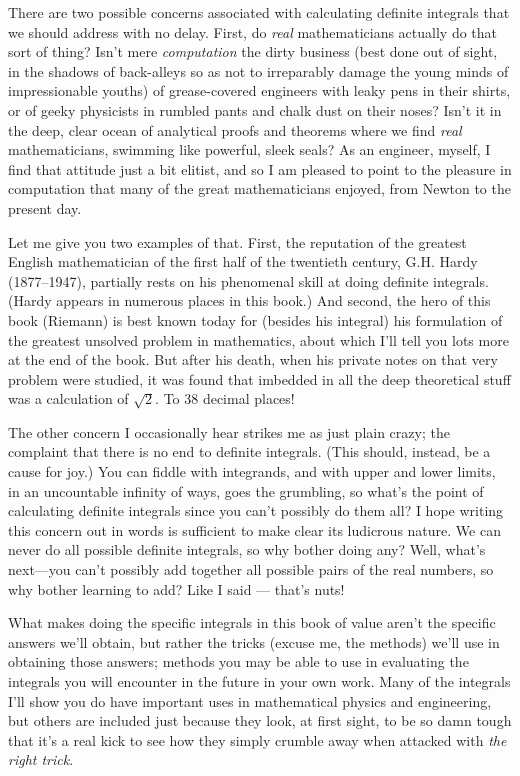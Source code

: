 There are two possible concerns associated with calculating definite integrals
that we should address with no delay. First, do \textit{real} mathematicians actually do that
sort of thing? Isn't mere \textit{computation} the dirty business (best done out of sight, in
the shadows of back-alleys so as not to irreparably damage the young minds of
impressionable youths) of grease-covered engineers with leaky pens in their shirts,
or of geeky physicists in rumbled pants and chalk dust on their noses? Isn't it in the
deep, clear ocean of analytical proofs and theorems where we find \textit{real}
mathematicians, swimming like powerful, sleek seals? As an engineer, myself, I find that
attitude just a bit elitist, and so I am pleased to point to the pleasure in computation
that many of the great mathematicians enjoyed, from Newton to the present day.

Let me give you two examples of that. First, the reputation of the greatest
English mathematician of the first half of the twentieth century, G.H. Hardy
(1877–1947), partially rests on his phenomenal skill at doing definite integrals.
(Hardy appears in numerous places in this book.) And second, the hero of this book
(Riemann) is best known today for (besides his integral) his formulation of the
greatest unsolved problem in mathematics, about which I'll tell you lots more at the
end of the book. But after his death, when his private notes on that very problem
were studied, it was found that imbedded in all the deep theoretical stuff was a
calculation of $ \sqrt{2} $. To 38 decimal places!

The other concern I occasionally hear strikes me as just plain crazy; the
complaint that there is no end to definite integrals. (This should, instead, be a
cause for joy.) You can fiddle with integrands, and with upper and lower limits, in
an uncountable infinity of ways, goes the grumbling, so what's the point of
calculating definite integrals since you can't possibly do them all? I hope writing
this concern out in words is sufficient to make clear its ludicrous nature. We can
never do all possible definite integrals, so why bother doing any? Well, what's
next—you can't possibly add together all possible pairs of the real numbers, so why
bother learning to add? Like I said --- that's nuts!

What makes doing the specific integrals in this book of value aren't the specific
answers we'll obtain, but rather the tricks (excuse me, the methods) we'll use in
obtaining those answers; methods you may be able to use in evaluating the integrals
you will encounter in the future in your own work. Many of the integrals I'll show
you do have important uses in mathematical physics and engineering, but others are
included just because they look, at first sight, to be so damn tough that it's a real
kick to see how they simply crumble away when attacked with \textit{the right trick}.


